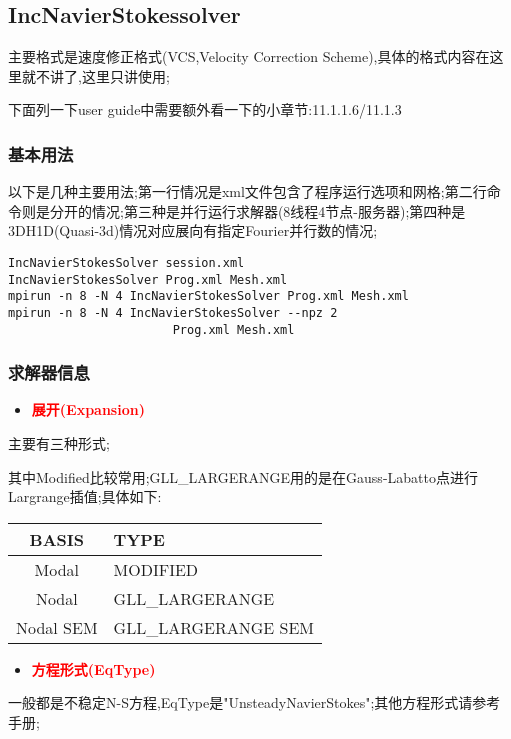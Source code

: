 \subsection{IncNavierStokessolver} \label{INSS}
主要格式是速度修正格式(VCS,Velocity Correction Scheme),具体的格式内容在这里就不讲了,这里只讲使用;\par
下面列一下user guide中需要额外看一下的小章节:11.1.1.6/11.1.3

\subsubsection{基本用法}
以下是几种主要用法;第一行情况是xml文件包含了程序运行选项和网格;第二行命令则是分开的情况;第三种是并行运行求解器(8线程4节点-服务器);第四种是3DH1D(Quasi-3d)情况对应展向有指定Fourier并行数的情况;
\begin{lstlisting}[frame=single]
IncNavierStokesSolver session.xml
IncNavierStokesSolver Prog.xml Mesh.xml
mpirun -n 8 -N 4 IncNavierStokesSolver Prog.xml Mesh.xml
mpirun -n 8 -N 4 IncNavierStokesSolver --npz 2 
				       Prog.xml Mesh.xml
\end{lstlisting}
\par

\subsubsection{求解器信息}
\begin{itemize}
\item{\textcolor{red}{\textbf{展开(Expansion)}}}
\end{itemize}
\par
主要有三种形式;\par
其中Modified比较常用;GLL\_LARGERANGE用的是在Gauss-Labatto点进行Largrange插值;具体如下:
\begin{table}[h]
	\centering
\begin{tabular}{c|l}
	\hline 
	BASIS  	 	 & TYPE              \\ 
	\hline
	Modal		 & MODIFIED    \\ 

	Nodal		 & GLL\_LARGERANGE \\ 

	Nodal SEM	 & GLL\_LARGERANGE SEM  \\ 	
	\hline 
\end{tabular} 
\end{table}



\par
\begin{itemize}
	\item{\textcolor{red}{\textbf{方程形式(EqType)}}}
\end{itemize}
一般都是不稳定N-S方程,EqType是"UnsteadyNavierStokes";其他方程形式请参考手册;\par

